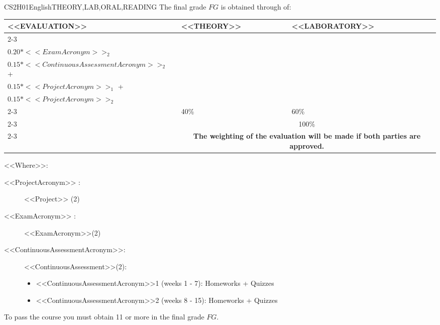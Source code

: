     \begin{evaluation}{CS2H01}{English}{THEORY,LAB,ORAL,READING}
    The final grade $FG$ is obtained through of:
   
    \begin{tabularx}{0.9\textwidth}{|X|p{}|p{}|} \hline
      \multirow{4}{*}{\uppercase{<<Evaluation>>}} & \uppercase{<<Theory>>} & \uppercase{<<Laboratory>>} \\ \cline{2-3}
      & %
          \begin{minipage}{0.95\textwidth}
          \begin{tabular}{l}
              $0.20*<<ExamAcronym>>_{1}$  + \\
              $0.20*<<ExamAcronym>>_{2}$  
          \end{tabular} 
          \end{minipage} 
      & %
          \begin{minipage}{0.95\textwidth}
          \begin{tabular}{l}
              $0.15*<<ContinuousAssessmentAcronym>>_{1}$  + \\
              $0.15*<<ContinuousAssessmentAcronym>>_{2}$  + \\
              $0.15*<<ProjectAcronym>>_{1}$  + \\
              $0.15*<<ProjectAcronym>>_{2}$ 
          \end{tabular} 
          \end{minipage}                 \\ \cline{2-3}
      
      & %
      40\% 
      & %
      60\% \\ \cline{2-3}
      & \multicolumn{2}{c|}{100\%}  \\ \cline{2-3}
      & \multicolumn{2}{c|}{\textbf{The weighting of the evaluation will be made if both parties are approved.}}  \\ \hline
      \end{tabularx}
        
      \vspace{2mm}
      \noindent <<Where>>:
      \begin{description}
        \item[<<ProjectAcronym>> :] <<Project>> (2)
        \item[<<ExamAcronym>> :] <<ExamAcronym>>(2)
        \item[<<ContinuousAssessmentAcronym>>:]<<ContinuousAssessment>>(2):
        \begin{itemize}
            \item <<ContinuousAssessmentAcronym>>1 (weeks 1 - 7): Homeworks + Quizzes
            \item <<ContinuousAssessmentAcronym>>2 (weeks 8 - 15): Homeworks + Quizzes
        \end{itemize}
      \end{description}
   
    \noindent To pass the course you must obtain 11 or more in the final grade $FG$.
    \end{evaluation}